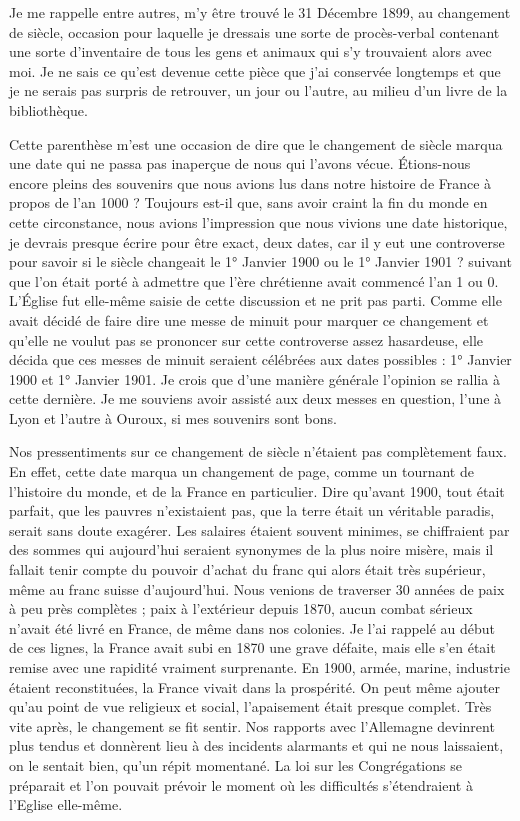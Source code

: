 \documentclass[11pt,a4paper]{report}
\begin{document}
Je me rappelle entre autres, m'y être trouvé le 31 Décembre 1899, au changement de siècle, occasion pour laquelle je dressais une sorte de procès-verbal contenant une sorte d'inventaire de tous les gens et animaux qui s'y trouvaient alors avec moi. Je ne sais ce qu'est devenue cette pièce que j'ai conservée longtemps et que je ne serais pas surpris de retrouver, un jour ou l'autre, au milieu d'un livre de la bibliothèque.

Cette parenthèse m'est une occasion de dire que le changement de siècle marqua une date qui ne passa pas inaperçue de nous qui l'avons vécue. Étions-nous encore pleins des souvenirs que nous avions lus dans notre histoire de France à propos de l'an 1000 ? Toujours est-il que, sans avoir craint la fin du monde en cette circonstance, nous avions l'impression que nous vivions une date historique, je devrais presque écrire pour être exact, deux dates, car il y eut une controverse pour savoir si le siècle changeait le 1° Janvier 1900 ou le 1° Janvier 1901 ? suivant que l'on était porté à admettre que l'ère chrétienne avait commencé l'an 1 ou 0. L'Église fut elle-même saisie de cette discussion et ne prit pas parti. Comme elle avait décidé de faire dire une messe de minuit pour marquer ce changement et qu'elle ne voulut pas se prononcer sur cette controverse assez hasardeuse, elle décida que ces messes de minuit seraient célébrées aux dates possibles : 1° Janvier 1900 et 1° Janvier 1901. Je crois que d'une manière générale l'opinion se rallia à cette dernière. Je me souviens avoir assisté aux deux messes en question, l'une à Lyon et l'autre à Ouroux, si mes souvenirs sont bons.

Nos pressentiments sur ce changement de siècle n'étaient pas complètement faux. En effet, cette date marqua un changement de page, comme un tournant de l'histoire du monde, et de la France en particulier. Dire qu'avant 1900, tout était parfait, que les pauvres n'existaient pas, que la terre était un véritable paradis, serait sans doute exagérer. Les salaires étaient souvent minimes, se chiffraient par des sommes qui aujourd'hui seraient synonymes de la plus noire misère, mais il fallait tenir compte du pouvoir d'achat du franc qui alors était très supérieur, même au franc suisse d'aujourd'hui. Nous venions de traverser 30 années de paix à peu près complètes ; paix à l'extérieur depuis 1870, aucun combat sérieux n'avait été livré en France, de même dans nos colonies. Je l'ai rappelé au début de ces lignes, la France avait subi en 1870 une grave défaite, mais elle s'en était remise avec une rapidité vraiment surprenante. En 1900, armée, marine, industrie étaient reconstituées, la France vivait dans la prospérité. On peut même ajouter qu'au point de vue religieux et social, l'apaisement était presque complet. Très vite après, le changement se fit sentir. Nos rapports avec l'Allemagne devinrent plus tendus et donnèrent lieu à des incidents alarmants et qui ne nous laissaient, on le sentait bien, qu'un répit momentané. La loi sur les Congrégations se préparait et l'on pouvait prévoir le moment où les difficultés s'étendraient à l'Eglise elle-même.
\end{document}
